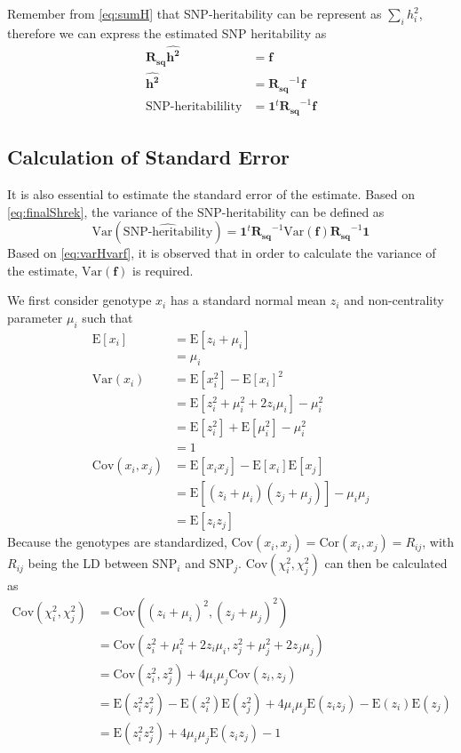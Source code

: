 \documentclass[12pt]{scrbook}
\begin{document}
Remember from \cref{eq:sumH} that \gls{SNP}-heritability can be represent as $\sum_ih_i^2$, therefore we can express the estimated \gls{SNP} heritability as 
\begin{align}
\boldsymbol{R_{sq}\hat{h^2}}&=\boldsymbol{f}\nonumber\\
\boldsymbol{\hat{h^2}}&=\boldsymbol{R_{sq}}^{-1}\boldsymbol{f}\nonumber\\
\text{SNP-heritabilility}&=\boldsymbol{1}^t\boldsymbol{R_{sq}}^{-1}\boldsymbol{f}
\label{eq:finalShrek}
\end{align}

\subsection{Calculation of Standard Error}
It is also essential to estimate the standard error of the estimate.
Based on \cref{eq:finalShrek}, the variance of the \gls{SNP}-heritability can be defined as
\begin{equation}
\mathrm{Var}(\hat{\text{SNP-heritability}})=\boldsymbol{1}^t\boldsymbol{R_{sq}}^{-1}\mathrm{Var}(\boldsymbol{f})\boldsymbol{R_{sq}}^{-1}\boldsymbol{1}
\label{eq:varHvarf}
\end{equation}
Based on \cref{eq:varHvarf}, it is observed that in order to calculate the variance of the estimate, $\mathrm{Var}(\boldsymbol{f})$ is required.

We first consider genotype $x_i$ has a standard normal mean $z_i$ and non-centrality parameter $\mu_i$ such that
\begin{align}
\mathrm{E}[x_i]&=\mathrm{E}[z_i+\mu_i] \nonumber\\
&=\mu_i\\
\mathrm{Var}(x_i)&=\mathrm{E}[x_i^2]-\mathrm{E}[x_i]^2\nonumber\\
&=\mathrm{E}[z_i^2+\mu_i^2+2z_i\mu_i]-\mu_i^2\nonumber\\
&=\mathrm{E}[z_i^2]+\mathrm{E}[\mu_i^2]-\mu_i^2\nonumber\\
&=1\\
\mathrm{Cov}(x_i,x_j)&=\mathrm{E}[x_ix_j]-\mathrm{E}[x_i]\mathrm{E}[x_j]\nonumber\\
&=\mathrm{E}[(z_i+\mu_i)(z_j+\mu_j)]-\mu_i\mu_j\nonumber\\
&=\mathrm{E}[z_iz_j]
\end{align}
Because the genotypes are standardized, $\mathrm{Cov}(x_i,x_j)=\mathrm{Cor}(x_i,x_j)=R_{ij}$, with $R_{ij}$ being the \gls{LD} between \gls{SNP}$_i$ and \gls{SNP}$_j$.
$\mathrm{Cov}(\chi_i^2, \chi_j^2)$ can then be calculated as 
\begin{align}
\mathrm{Cov}(\chi_i^2, \chi_j^2)&=\mathrm{Cov}\left((z_i+\mu_i)^2,(z_j+\mu_j)^2\right)\nonumber\\
&=\mathrm{Cov}\left(z_i^2+\mu_i^2+2z_i\mu_i, z_j^2+\mu_j^2+2z_j\mu_j \right)\nonumber\\
&=\mathrm{Cov}(z_i^2,z_j^2)+4\mu_i\mu_j\mathrm{Cov}(z_i,z_j)\nonumber\\
&=\mathrm{E}(z_i^2z_j^2)-\mathrm{E}(z_i^2)\mathrm{E}(z_j^2)+4\mu_i\mu_j\mathrm{E}(z_iz_j)-\mathrm{E}(z_i)\mathrm{E}(z_j)\nonumber\\
&=\mathrm{E}(z_i^2z_j^2)+4\mu_i\mu_j\mathrm{E}(z_iz_j)-1
\end{align}
\end{document}
